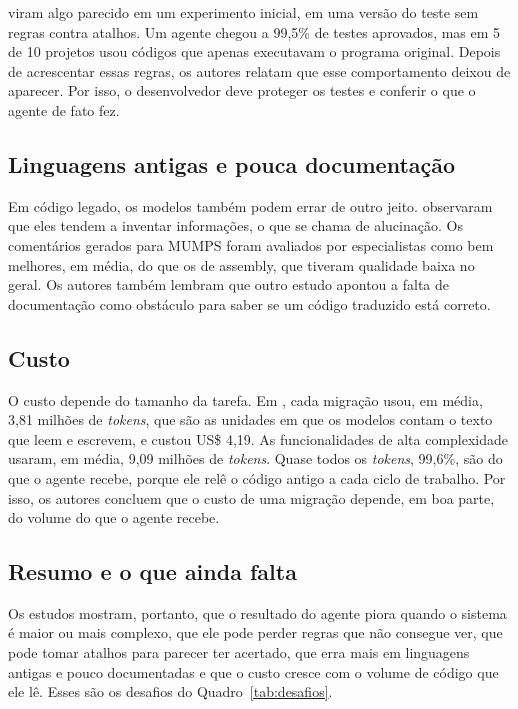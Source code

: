  viram algo parecido em um experimento inicial, em uma versão do teste sem regras contra atalhos. Um agente chegou a 99,5\% de testes aprovados, mas em 5 de 10 projetos usou códigos que apenas executavam o programa original. Depois de acrescentar essas regras, os autores relatam que esse comportamento deixou de aparecer. Por isso, o desenvolvedor deve proteger os testes e conferir o que o agente de fato fez.

\subsection*{Linguagens antigas e pouca documentação}

Em código legado, os modelos também podem errar de outro jeito.  observaram que eles tendem a inventar informações, o que se chama de alucinação. Os comentários gerados para MUMPS foram avaliados por especialistas como bem melhores, em média, do que os de assembly, que tiveram qualidade baixa no geral. Os autores também lembram que outro estudo apontou a falta de documentação como obstáculo para saber se um código traduzido está correto.

\subsection*{Custo}

O custo depende do tamanho da tarefa. Em , cada migração usou, em média, 3,81 milhões de \textit{tokens}, que são as unidades em que os modelos contam o texto que leem e escrevem, e custou US\$ 4,19. As funcionalidades de alta complexidade usaram, em média, 9,09 milhões de \textit{tokens}. Quase todos os \textit{tokens}, 99,6\%, são do que o agente recebe, porque ele relê o código antigo a cada ciclo de trabalho. Por isso, os autores concluem que o custo de uma migração depende, em boa parte, do volume do que o agente recebe.

\subsection*{Resumo e o que ainda falta}

Os estudos mostram, portanto, que o resultado do agente piora quando o sistema é maior ou mais complexo, que ele pode perder regras que não consegue ver, que pode tomar atalhos para parecer ter acertado, que erra mais em linguagens antigas e pouco documentadas e que o custo cresce com o volume de código que ele lê. Esses são os desafios do Quadro~\ref{tab:desafios}.

